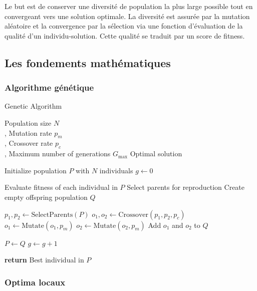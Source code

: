 \documentclass[journal, a4paper]{IEEEtran}
\begin{document}
	Le but est de conserver une diversité de population la plus large
	possible
	tout en convergeant vers une solution optimale.
	La diversité est assurée par la mutation aléatoire
	et la convergence par la sélection via une fonction  d'évaluation
	de la qualité d'un individu-solution.
	Cette qualité se traduit par un score de fitness.

	\subsection{Les fondements mathématiques}\label{subsec:les-fondements-mathematiques}

	\subsubsection{Algorithme génétique}
	\begin{center}
	\begin{algorithm}
		  \caption{Genetic Algorithm}\label{alg:ga}
			\Require Population size $N$
			\\ , Mutation rate $p_m$
			\\ , Crossover rate $p_c$
			\\ , Maximum number of generations $G_{\max}$
			\Ensure Optimal solution

			\State Initialize population $P$ with $N$ individuals
			\State $g \gets 0$

			  \State Evaluate fitness of each individual in $P$
			  \State Select parents for reproduction
			  \State Create empty offspring population $Q$

				\State $p_1, p_2 \gets \text{SelectParents}(P)$
				\State $o_1, o_2 \gets \text{Crossover}(p_1, p_2, p_c)$
				\State $o_1 \gets \text{Mutate}(o_1, p_m)$
				\State $o_2 \gets \text{Mutate}(o_2, p_m)$
				\State Add $o_1$ and $o_2$ to $Q$
			  \EndWhile

			  \State $P \gets Q$
			  \State $g \gets g + 1$
			\EndWhile

			\State \textbf{return} Best individual in $P$
	\end{algorithm}
	\end{center}

	\subsubsection{Optima locaux}\label{subsec:extrema-locaux}
%
\end{document}
